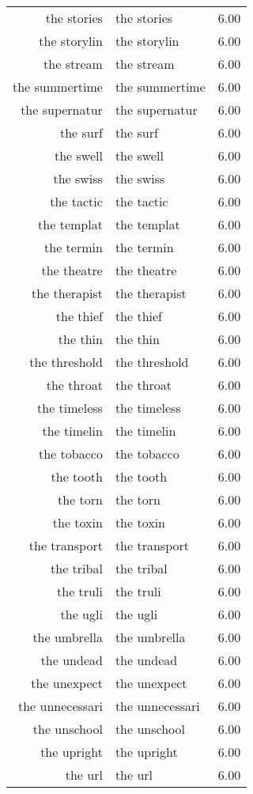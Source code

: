 \begin{table}[ht]
\begin{tabular}{rlr}
  the stories & the stories & 6.00 \\ 
  the storylin & the storylin & 6.00 \\ 
  the stream & the stream & 6.00 \\ 
  the summertime & the summertime & 6.00 \\ 
  the supernatur & the supernatur & 6.00 \\ 
  the surf & the surf & 6.00 \\ 
  the swell & the swell & 6.00 \\ 
  the swiss & the swiss & 6.00 \\ 
  the tactic & the tactic & 6.00 \\ 
  the templat & the templat & 6.00 \\ 
  the termin & the termin & 6.00 \\ 
  the theatre & the theatre & 6.00 \\ 
  the therapist & the therapist & 6.00 \\ 
  the thief & the thief & 6.00 \\ 
  the thin & the thin & 6.00 \\ 
  the threshold & the threshold & 6.00 \\ 
  the throat & the throat & 6.00 \\ 
  the timeless & the timeless & 6.00 \\ 
  the timelin & the timelin & 6.00 \\ 
  the tobacco & the tobacco & 6.00 \\ 
  the tooth & the tooth & 6.00 \\ 
  the torn & the torn & 6.00 \\ 
  the toxin & the toxin & 6.00 \\ 
  the transport & the transport & 6.00 \\ 
  the tribal & the tribal & 6.00 \\ 
  the truli & the truli & 6.00 \\ 
  the ugli & the ugli & 6.00 \\ 
  the umbrella & the umbrella & 6.00 \\ 
  the undead & the undead & 6.00 \\ 
  the unexpect & the unexpect & 6.00 \\ 
  the unnecessari & the unnecessari & 6.00 \\ 
  the unschool & the unschool & 6.00 \\ 
  the upright & the upright & 6.00 \\ 
  the url & the url & 6.00 \\ 

\end{tabular}
\end{table}
